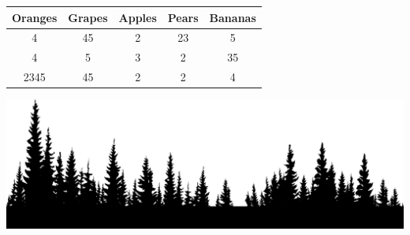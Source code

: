 \documentclass{article}
\begin{document}
\begin{tabular}{|c|c|c|c|c|}
\hline
Oranges & Grapes & Apples & Pears & Bananas \\
\hline
4 & 45 & 2 & 23 & 5 \\
4 & 5 & 3 & 2 & 35 \\
2345 & 45 & 2 & 2 & 4 \\
\hline
\end{tabular}

\includegraphics[width=1\linewidth]{./data/forest.png}
\end{document}
